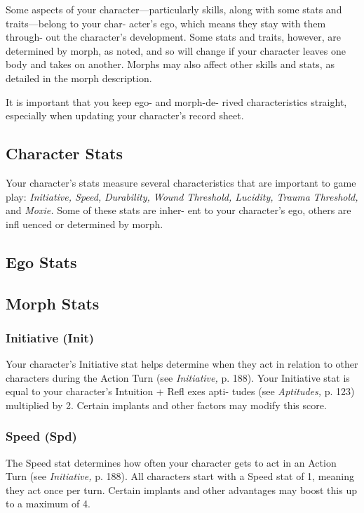Some aspects of your character—particularly skills, 
along with some stats and traits—belong to your char-
acter's ego, which means they stay with them through-
out the character's development. Some stats and traits, 
however, are determined by morph, as noted, and so 
will change if your character leaves one body and 
takes on another. Morphs may also affect other skills 
and stats, as detailed in the morph description.

It is important that you keep ego- and morph-de-
rived characteristics straight, especially when updating 
your character's record sheet.

\subsection{Character Stats}

Your character's stats measure several characteristics 
that are important to game play: \textit{Initiative, Speed, }
\textit{Durability, Wound Threshold, Lucidity, Trauma }
\textit{Threshold,} and \textit{Moxie.} Some of these stats are inher-
ent to your character's ego, others are infl uenced or 
determined by morph.

\subsection{Ego Stats}


\subsection{Morph Stats}


\subsubsection{Initiative (Init)}

Your character's Initiative stat helps determine when 
they act in relation to other characters during the 
Action Turn (see \textit{Initiative,} p. 188). Your Initiative stat 
is equal to your character's Intuition + Refl exes apti-
tudes (see \textit{Aptitudes,} p. 123) multiplied by 2. Certain 
implants and other factors may modify this score.

\subsubsection{Speed (Spd)}

The Speed stat determines how often your character 
gets to act in an Action Turn (see \textit{Initiative,} p. 188). 
All characters start with a Speed stat of 1, meaning 
they act once per turn. Certain implants and other 
advantages may boost this up to a maximum of 4.


